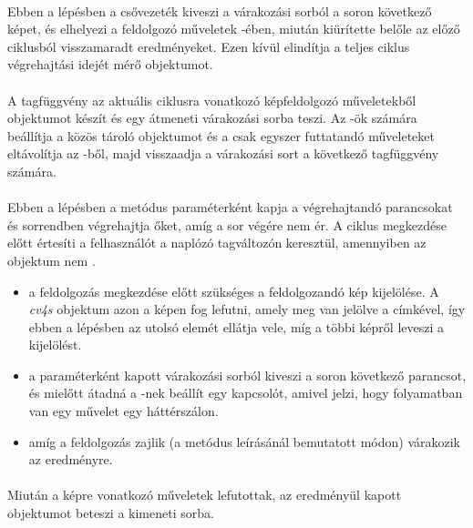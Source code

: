 \paragraph{} Ebben a lépésben a csővezeték kiveszi a  várakozási sorból a soron következő képet, és elhelyezi a feldolgozó műveletek -ében, miután kiürítette belőle az előző ciklusból visszamaradt eredményeket. Ezen kívül elindítja a teljes ciklus végrehajtási idejét mérő  objektumot.
\paragraph{} A tagfüggvény az aktuális ciklusra vonatkozó képfeldolgozó műveletekből  objektumot készít és egy átmeneti várakozási sorba teszi. Az -ök számára beállítja a közös tároló objektumot és a csak egyszer futtatandó műveleteket eltávolítja az -ből, majd visszaadja a várakozási sort a következő tagfüggvény számára.
\paragraph{} Ebben a lépésben a metódus paraméterként kapja a végrehajtandó parancsokat és sorrendben végrehajtja őket, amíg a sor végére nem ér. A ciklus megkezdése előtt értesíti a felhasználót a naplózó tagváltozón keresztül, amennyiben az objektum nem . 
\begin{itemize}
	\item {} a feldolgozás megkezdése előtt szükséges a feldolgozandó kép kijelölése. A \emph{cv4s}  objektum azon a képen fog lefutni, amely meg van jelölve a  címkével, így ebben a lépésben az  utolsó elemét ellátja vele, míg a többi képről leveszi a kijelölést.
	\item {} a paraméterként kapott várakozási sorból kiveszi a soron következő parancsot, és mielőtt átadná a -nek beállít egy kapcsolót, amivel jelzi, hogy folyamatban van egy művelet egy háttérszálon.
	\item {} amíg a feldolgozás zajlik (a  metódus leírásánál bemutatott módon) várakozik az eredményre.
\end{itemize}
\paragraph{} Miután a képre vonatkozó műveletek lefutottak, az eredményül kapott  objektumot beteszi a kimeneti sorba.
